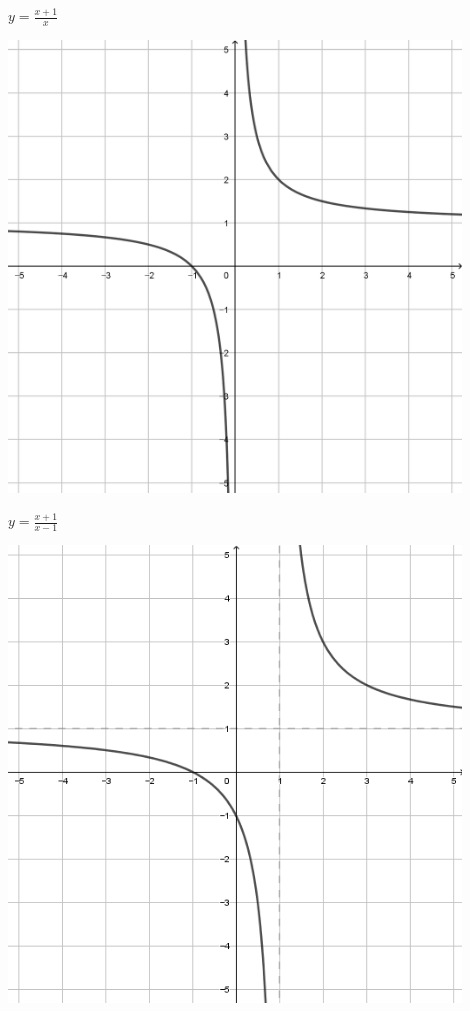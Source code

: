 \documentclass[a4paper]{oblivoir}
\begin{document}
\clearpage
\begin{minipage}{0.45\textwidth}\centering
\(y=\frac{x+1}{x}\)
\par\bigskip\includegraphics[width=0.9\textwidth]{img/21-1}
\end{minipage}
\begin{minipage}{0.45\textwidth}\centering
\(y=\frac{x+1}{x-1}\)
\par\bigskip\includegraphics[width=0.9\textwidth]{img/21-2}
\end{minipage}\bigskip\bigskip\par
\end{document}
